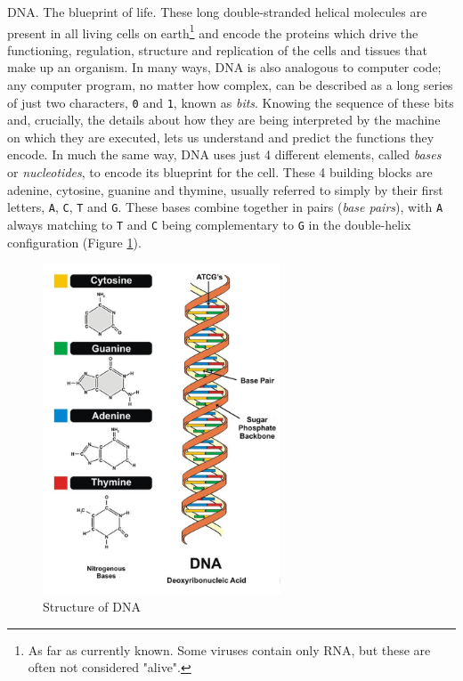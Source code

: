 DNA. The blueprint of life. These long double-stranded helical molecules are present in all living cells on earth\footnote{As far as currently known. Some viruses contain only RNA, but these are often not considered "alive".} and encode the proteins which drive the functioning, regulation, structure and replication of the cells and tissues that make up an organism. In many ways, DNA is also analogous to computer code; any computer program, no matter how complex, can be described as a long series of just two characters, \verb+0+ and \verb+1+, known as \emph{bits}. Knowing the sequence of these bits and, crucially, the details about how they are being interpreted by the machine on which they are executed, lets us understand and predict the functions they encode. In much the same way, DNA uses just 4 different elements, called \emph{bases} or \emph{nucleotides}, to encode its blueprint for the cell. These 4 building blocks are adenine, cytosine, guanine and thymine, usually referred to simply by their first letters, \verb+A+, \verb+C+, \verb+T+ and \verb+G+. These bases combine together in pairs (\emph{base pairs}), with \verb+A+ always matching to \verb+T+ and \verb+C+ being complementary to \verb+G+ in the double-helix configuration (Figure \ref{fig:dnastructure}).

\begin{figure}[h!]
    \centering
    \includegraphics[width=200pt]{chapters/images/introduction/dna-structure.png}
    \caption{Structure of DNA}
    \label{fig:dnastructure}
\end{figure}




